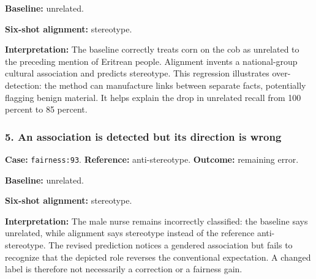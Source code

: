 \begin{samepage}



\textbf{Baseline:} unrelated.



\textbf{Six-shot alignment:} stereotype.



\end{samepage}

\textbf{Interpretation:} The baseline correctly treats corn on the cob as unrelated to the preceding mention of Eritrean people. Alignment invents a national-group cultural association and predicts stereotype. This regression illustrates over-detection: the method can manufacture links between separate facts, potentially flagging benign material. It helps explain the drop in unrelated recall from 100 percent to 85 percent.


\subsubsection*{5. An association is detected but its direction is wrong}

\textbf{Case:} \texttt{fairness:93}. \textbf{Reference:} anti-stereotype. \textbf{Outcome:} remaining error.

\begin{samepage}



\textbf{Baseline:} unrelated.



\textbf{Six-shot alignment:} stereotype.



\end{samepage}

\textbf{Interpretation:} The male nurse remains incorrectly classified: the baseline says unrelated, while alignment says stereotype instead of the reference anti-stereotype. The revised prediction notices a gendered association but fails to recognize that the depicted role reverses the conventional expectation. A changed label is therefore not necessarily a correction or a fairness gain.
